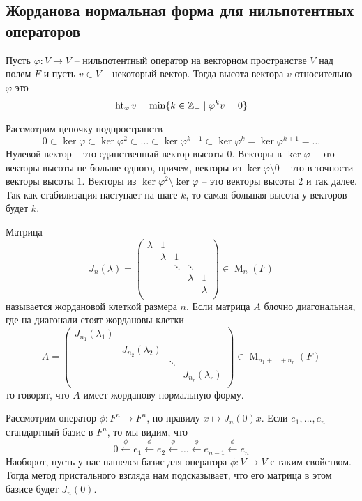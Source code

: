 \subsection{Жорданова нормальная форма для нильпотентных операторов}

\begin{definition}
Пусть $\varphi \colon V\to V$ -- нильпотентный оператор на векторном пространстве $V$ над полем $F$ и пусть $v\in V$ -- некоторый вектор. Тогда высота вектора $v$ относительно $\varphi$ это 
\[
\operatorname{ht}_\varphi v = \min\{k\in \mathbb Z_+ \mid \varphi^k v = 0\}
\]
\end{definition}

Рассмотрим цепочку подпространств
\[
0\subset \ker \varphi \subset \ker \varphi^2 \subset \ldots \subset \ker \varphi^{k-1} \subset \ker \varphi^k = \ker \varphi^{k+1} = \ldots
\]
Нулевой вектор -- это единственный вектор высоты $0$. Векторы в $\ker \varphi$ -- это векторы высоты не больше одного, причем, векторы из $\ker \varphi \setminus 0$ -- это в точности векторы высоты $1$. Векторы из $\ker\varphi^2 \setminus \ker \varphi$ -- это векторы высоты $2$ и так далее. Так как стабилизация наступает на шаге $k$, то самая большая высота у векторов будет $k$.

\begin{definition}\label{def::JNF}
Матрица 
\[
J_n(\lambda) = 
\begin{pmatrix}
{\lambda}&{1}&{}&{}&{}\\
{}&{\lambda}&{1}&{}&{}\\
{}&{}&{\ddots}&{\ddots}&{}\\
{}&{}&{}&{\lambda}&{1}\\
{}&{}&{}&{}&{\lambda}\\
\end{pmatrix}
\in \operatorname{M}_n(F)
\]
называется жордановой клеткой размера $n$. Если матрица $A$ блочно диагональная, где на диагонали стоят жордановы клетки
\[
A = 
\begin{pmatrix}
{J_{n_1}(\lambda_1)}&{}&{}&{}\\
{}&{J_{n_2}(\lambda_2)}&{}&{}\\
{}&{}&{\ddots}&{}\\
{}&{}&{}&{J_{n_r}(\lambda_r)}\\
\end{pmatrix}
\in \operatorname{M}_{n_1 + \ldots + n_r}(F)
\]
то говорят, что $A$ имеет жорданову нормальную форму.
\end{definition}

Рассмотрим оператор $\phi\colon F^n \to F^n$, по правилу $x\mapsto J_n(0)x$. Если $e_1, \ldots ,e_n$ -- стандартный базис в $F^n$, то мы видим, что 
\[
0\stackrel{\phi}{\longleftarrow}e_1\stackrel{\phi}{\longleftarrow}e_2 \stackrel{\phi}{\longleftarrow}\ldots\stackrel{\phi}{\longleftarrow}e_{n-1}\stackrel{\phi}{\longleftarrow}e_n
\]
Наоборот, пусть у нас нашелся базис для оператора $\phi\colon V\to V$ с таким свойством. Тогда метод пристального взгляда нам подсказывает, что его матрица в этом базисе будет $J_n(0)$. 

